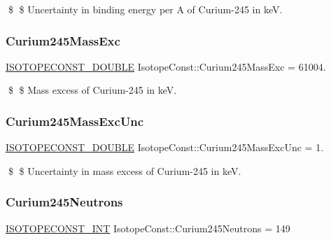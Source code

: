 \$ \$ Uncertainty in binding energy per A of Curium-\/245 in keV. \mbox{\label{group___isotope_const-_curium-_cm245_ga34baa0ed6d123da61a79613350976623}} 
\subsubsection{\texorpdfstring{Curium245\+Mass\+Exc}{Curium245MassExc}}
{\footnotesize\ttfamily \mbox{\hyperlink{group___isotope_const-_macros_ga8f45a7272ce02c0b4c65c44636ed719a}{I\+S\+O\+T\+O\+P\+E\+C\+O\+N\+S\+T\+\_\+\+D\+O\+U\+B\+LE}} Isotope\+Const\+::\+Curium245\+Mass\+Exc = 61004.}

\$ \$ Mass excess of Curium-\/245 in keV. \mbox{\label{group___isotope_const-_curium-_cm245_ga36d25e4f4eaecdd0028544189a53ddf2}} 
\subsubsection{\texorpdfstring{Curium245\+Mass\+Exc\+Unc}{Curium245MassExcUnc}}
{\footnotesize\ttfamily \mbox{\hyperlink{group___isotope_const-_macros_ga8f45a7272ce02c0b4c65c44636ed719a}{I\+S\+O\+T\+O\+P\+E\+C\+O\+N\+S\+T\+\_\+\+D\+O\+U\+B\+LE}} Isotope\+Const\+::\+Curium245\+Mass\+Exc\+Unc = 1.}

\$ \$ Uncertainty in mass excess of Curium-\/245 in keV. \mbox{\label{group___isotope_const-_curium-_cm245_gaab0a329f23105dcd56ddff486b7193d8}} 
\subsubsection{\texorpdfstring{Curium245\+Neutrons}{Curium245Neutrons}}
{\footnotesize\ttfamily \mbox{\hyperlink{group___isotope_const-_macros_ga5f18360b3e99483a35c32d789e62621c}{I\+S\+O\+T\+O\+P\+E\+C\+O\+N\+S\+T\+\_\+\+I\+NT}} Isotope\+Const\+::\+Curium245\+Neutrons = 149}

